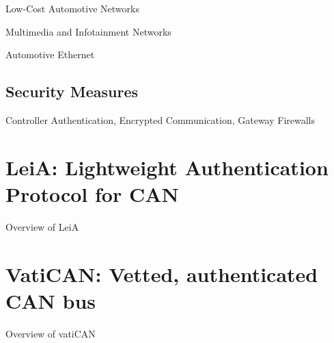 Low-Cost Automotive Networks

Multimedia and Infotainment Networks

Automotive Ethernet

\subsection{Security Measures}

Controller Authentication, Encrypted Communication, Gateway
Firewalls~\cite{Lemke2006}


\section{LeiA: Lightweight Authentication Protocol for CAN}
\label{sec:leia}

Overview of LeiA \cite{Radu2016}


\section{VatiCAN: Vetted, authenticated CAN bus}
\label{sec:vatican}

Overview of vatiCAN \cite{Nurnberger2016}

